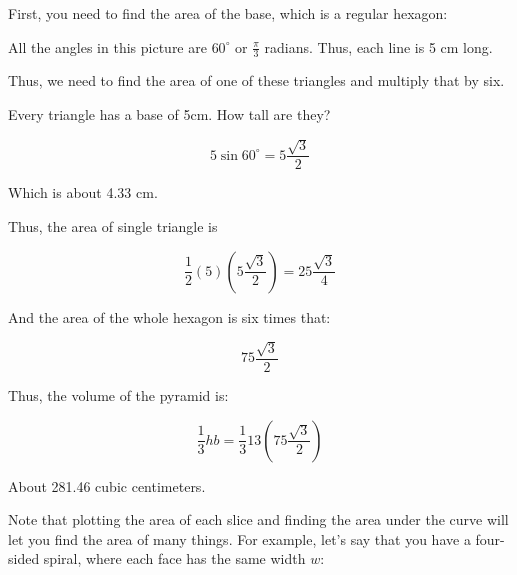 \begin{Answer}[ref=pyramid_volume]
  First, you need to find the area of the base, which is a regular hexagon:
  

All the angles in this picture are $60^\circ$ or $\frac{\pi}{3}$
radians. Thus, each line is 5 cm long.

Thus, we need to find the area of one of these triangles and multiply that by six.

Every triangle has a base of 5cm. How tall are they?


$$5 \sin{60^\circ} = 5\frac{\sqrt{3}}{2}$$

Which is about 4.33 cm.

Thus, the area of single triangle is 

$$\frac{1}{2} (5) \left( 5\frac{\sqrt{3}}{2} \right) = 25 \frac{\sqrt{3}} {4}$$

And the area of the whole hexagon is six times that:

$$75 \frac{\sqrt{3}}{2}$$

Thus, the volume of the pyramid is:

$$\frac{1}{3}h b = \frac{1}{3} 13 \left(75 \frac{\sqrt{3}}{2}\right)$$

About 281.46 cubic centimeters.

\end{Answer}

Note that plotting the area of each slice and finding the area under
the curve will let you find the area of many things.  For example,
let's say that you have a four-sided spiral, where each face has the
same width $w$:

